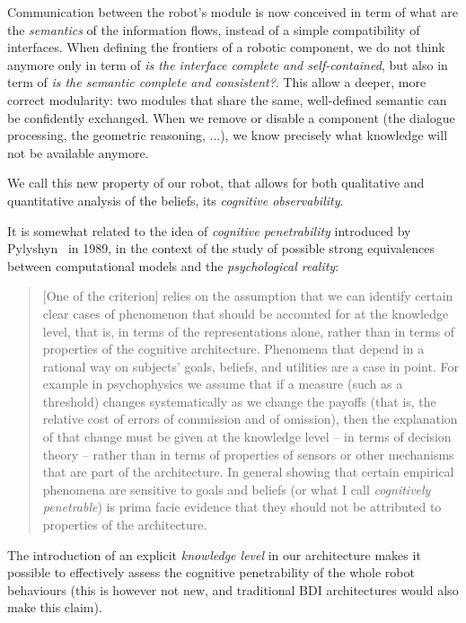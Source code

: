\documentclass[letterpaper, 10 pt, conference]{ieeeconf}  %
\begin{document}
Communication between the robot's module is now conceived in term of what are
the \emph{semantics} of the information flows, instead of a simple
compatibility of interfaces. When defining the frontiers of a robotic
component, we do not think anymore only in term of \emph{is the interface complete
and self-contained}, but also in term of \emph{is the semantic complete and
consistent?}. This allow a deeper, more correct modularity: two modules that
share the same, well-defined semantic can be confidently exchanged. When we
remove or disable a component (the dialogue processing, the geometric
reasoning, ...), we know precisely what knowledge will not be available
anymore.

We call this new property of our robot, that allows for both qualitative and
quantitative analysis of the beliefs, its \emph{cognitive observability}.

It is somewhat related to the idea of \emph{cognitive penetrability} introduced
by Pylyshyn~\cite{Pylyshyn1989} in 1989, in the context of the study of
possible strong equivalences between computational models and the
\emph{psychological reality}:

\begin{quote}

    [One of the criterion] relies on the assumption that we can identify
    certain clear cases of phenomenon that should be accounted for at the
    knowledge level, that is, in terms of the representations alone, rather
    than in terms of properties of the cognitive architecture. Phenomena that
    depend in a rational way on subjects' goals, beliefs, and utilities are a
    case in point. For example in psychophysics we assume that if a measure
    (such as a threshold) changes systematically as we change the payoffs (that
    is, the relative cost of errors of commission and of omission), then the
    explanation of that change must be given at the knowledge level -- in terms
    of decision theory -- rather than in terms of properties of sensors or
    other mechanisms that are part of the architecture. In general showing that
    certain empirical phenomena are sensitive to goals and beliefs (or what I
    call \emph{cognitively penetrable}) is prima facie evidence that they
    should not be attributed to properties of the architecture.

\end{quote}

The introduction of an explicit \emph{knowledge level} in our architecture
makes it possible to effectively assess the cognitive penetrability of the
whole robot behaviours (this is however not new, and traditional BDI
architectures would also make this claim).
\end{document}
